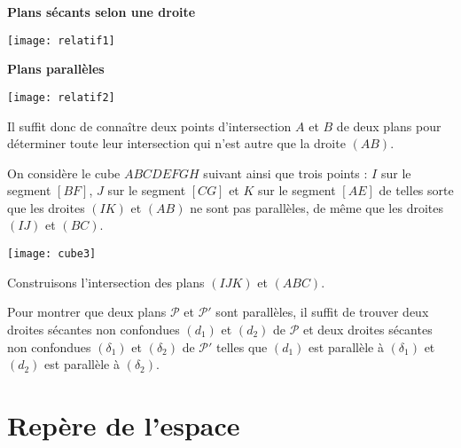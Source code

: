 \documentclass[11pt,fleqn, openany]{book} %
\begin{document}
\begin{minipage}{0.45\linewidth}\begin{center}
\textbf{Plans sécants selon une droite}
\end{center}
\begin{center}
\texttt{[image: relatif1]}
\end{center}
\end{minipage}\hfill \begin{minipage}{0.45\linewidth}\begin{center}
\textbf{Plans parallèles}
\end{center}
\begin{center}
\texttt{[image: relatif2]}
\end{center}
\end{minipage}

Il suffit donc de connaître deux points d'intersection $A$ et $B$  de deux plans pour déterminer toute leur intersection qui n'est autre que la droite $(AB)$.

\begin{example}On considère le cube $ABCDEFGH$ suivant ainsi que trois points : $I$ sur le segment $[BF]$, $J$ sur le segment $[CG]$ et $K$ sur le segment $[AE]$  de telles sorte que les droites $(IK)$ et $(AB)$ ne sont pas parallèles, de même que les droites $(IJ)$ et $(BC)$.

\begin{center}
\texttt{[image: cube3]}
\end{center}

Construisons l'intersection des plans $(IJK)$ et $(ABC)$.

\vskip180pt

\end{example}

\begin{proposition}Pour montrer que deux plans $\mathcal{P}$ et $\mathcal{P}'$ sont parallèles, il suffit de trouver deux droites sécantes non confondues $(d_1)$ et $(d_2)$ de $\mathcal{P}$ et deux droites sécantes non confondues $(\delta_1)$ et $(\delta_2)$ de $\mathcal{P}'$ telles que $(d_1)$ est parallèle à $(\delta_1)$ et $(d_2)$ est parallèle à $(\delta_2)$.\end{proposition}

\section{Repère de l'espace}
\end{document}
